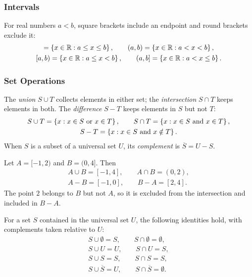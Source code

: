 \subsubsection{Intervals}
For real numbers $a<b$, square brackets include an endpoint and round brackets exclude it:
\begin{gather*}
    [a,b]=\set{x\in\R : a\leq x\leq b}, \qquad
    (a,b)=\set{x\in\R : a<x<b},\\
    [a,b)=\set{x\in\R : a\leq x<b}, \qquad
    (a,b]=\set{x\in\R : a<x\leq b}.
\end{gather*}

\subsubsection{Set Operations}
\begin{definition}
The \emph{union} $S\cup T$ collects elements in either set; the \emph{intersection} $S\cap T$ keeps elements in both. The \emph{difference} $S-T$ keeps elements in $S$ but not $T$:
\begin{gather*}
    S\cup T=\left\{x : x\in S\text{ or }x\in T\right\}, \qquad
    S\cap T=\left\{x : x\in S\text{ and }x\in T\right\},\\
    S-T=\left\{x : x\in S\text{ and }x\notin T\right\}.
\end{gather*}
When $S$ is a subset of a universal set $U$, its \emph{complement} is $\overline{S}=U-S$.
\end{definition}

\begin{example}
Let $A=[-1,2)$ and $B=(0,4]$. Then
\begin{gather*}
    A\cup B=[-1,4], \qquad A\cap B=(0,2),\\
    A-B=[-1,0], \qquad B-A=[2,4].
\end{gather*}
The point $2$ belongs to $B$ but not $A$, so it is excluded from the intersection and included in $B-A$.
\end{example}

For a set $S$ contained in the universal set $U$, the following identities
hold, with complements taken relative to $U$:
\begin{gather*}
    S\cup\emptyset=S, \qquad S\cap\emptyset=\emptyset,\\
    S\cup U=U, \qquad S\cap U=S,\\
    S\cup S=S, \qquad S\cap S=S,\\
    S\cup\overline{S}=U, \qquad S\cap\overline{S}=\emptyset.
\end{gather*}

